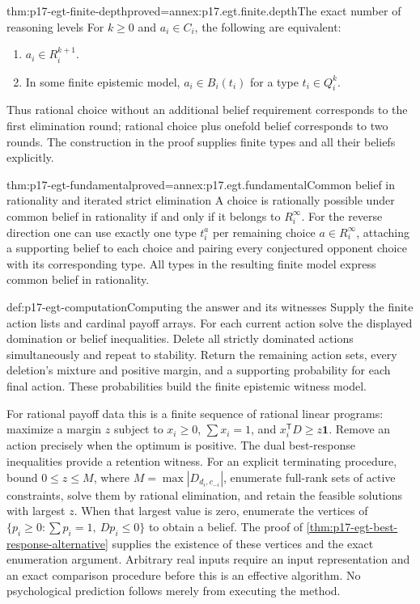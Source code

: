 \begin{hbtheorem}{thm:p17-egt-finite-depth}{proved=annex:p17.egt.finite.depth}{The exact number of reasoning levels}
For \(k\geq0\) and \(a_i\in C_i\), the following are equivalent:
\begin{enumerate}
\item \(a_i\in R_i^{k+1}\).
\item In some finite epistemic model, \(a_i\in B_i(t_i)\)
      for a type \(t_i\in Q_i^k\).
\end{enumerate}
Thus rational choice without an additional belief requirement
corresponds to the first elimination round; rational choice plus
onefold belief corresponds to two rounds. The construction in the
proof supplies finite types and all their beliefs explicitly.
\end{hbtheorem}

\begin{hbtheorem}{thm:p17-egt-fundamental}{proved=annex:p17.egt.fundamental}{Common belief in rationality and iterated strict elimination}
A choice is rationally possible under common belief in rationality
if and only if it belongs to \(R_i^\infty\).
For the reverse direction one can use exactly one type \(t_i^a\)
per remaining choice \(a\in R_i^\infty\), attaching a supporting
belief to each choice and pairing every conjectured opponent
choice with its corresponding type. All types in the resulting
finite model express common belief in rationality.
\end{hbtheorem}

\begin{hbmethod}{def:p17-egt-computation}{Computing the answer and its witnesses}
Supply the finite action lists and cardinal payoff arrays. For each
current action solve the displayed domination or belief inequalities.
Delete all strictly dominated actions simultaneously and repeat to
stability. Return the remaining action sets, every deletion's mixture
and positive margin, and a supporting probability for each final action.
These probabilities build the finite epistemic witness model.

For rational payoff data this is a finite sequence of rational linear
programs: maximize a margin \(z\) subject to
\(x_i\geq0\), \(\sum x_i=1\), and \(x_i^{\mathsf T}D\geq z\mathbf1\).
Remove an action precisely when the optimum is positive. The dual
best-response inequalities provide a retention witness.
For an explicit terminating procedure, bound \(0\leq z\leq M\),
where \(M=\max|D_{d_i,c_{-i}}|\), enumerate full-rank sets of
active constraints, solve them by rational elimination, and retain
the feasible solutions with largest \(z\).
When that largest value is zero, enumerate the vertices of
\(\{p_i\geq0:\sum p_i=1,\ Dp_i\leq0\}\) to obtain a belief.
The proof of \cref{thm:p17-egt-best-response-alternative} supplies
the existence of these vertices and the exact enumeration argument.
Arbitrary real inputs require an input representation and an exact
comparison procedure before this is an effective algorithm.
No psychological prediction follows merely from executing the method.
\end{hbmethod}

